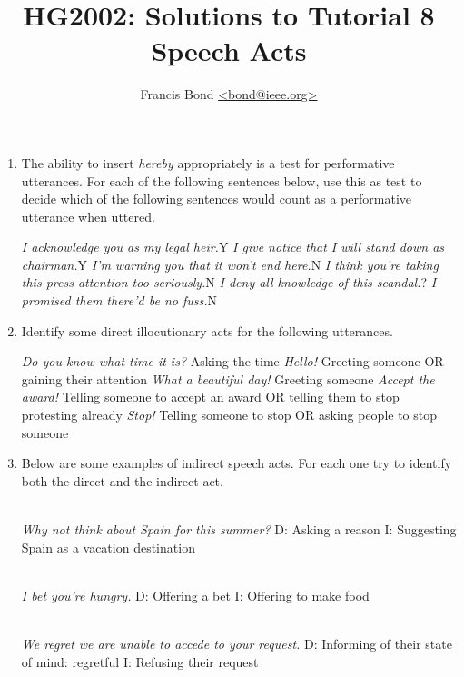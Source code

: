\documentclass[a4paper]{article}
\title{HG2002: Solutions to Tutorial 8\\  Speech Acts}
\author{Francis Bond \url{<bond@ieee.org>}}
\date{}%
\newcommand{\com}[1]{\hfill #1}
\begin{document}
\maketitle

\begin{enumerate}

\item The ability to insert \textit{hereby} appropriately is a test for performative utterances. For each of the following sentences below, use this as test to decide which of the following sentences would count as a performative utterance when uttered. 
  \begin{exe}
  \ex \textit{I acknowledge you as my legal heir.}\com{Y}
  \ex \textit{I give notice that I will stand down as chairman.}\com{Y}
  \ex \textit{I'm warning you that it won't end here.}\com{N}
  \ex \textit{I think you're taking this press attention too seriously.}\com{N}
  \ex \textit{I deny all knowledge of this scandal.}\com{?}
  \ex \textit{I promised them there'd be no fuss.}\com{N}
\end{exe}
\item Identify some direct illocutionary acts for the following utterances.
 \begin{exe}
   \ex \textit{Do you know what time it is?}
   \trans Asking the time
   \ex \textit{Hello! }
   \trans Greeting someone OR gaining their attention
   \ex \textit{What a beautiful day!}
   \trans Greeting someone
   \ex \textit{Accept the award!}
   \trans Telling someone to accept an award OR telling them to stop
   protesting already
   \ex \textit{Stop!}
   \trans Telling someone to stop OR asking people to stop someone 
\end{exe}

\item Below are some examples of indirect speech acts. For each one try to identify both the direct and the indirect act.
 \begin{exe}
\\ \textit{Why not think about Spain for this summer?}
\trans D: Asking a reason
\trans I: Suggesting Spain as a vacation destination

\\ \textit{I bet you're hungry.}
\trans D: Offering a bet
\trans I: Offering to make food

\\ \textit{We regret we are unable to accede to your request.}
\trans D: Informing of their state of mind: regretful
\trans I: Refusing their request


\end{exe}
\end{enumerate}
\end{document}
